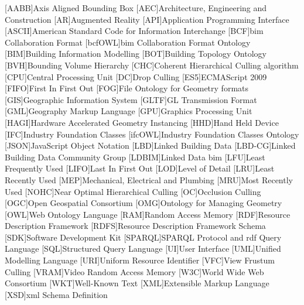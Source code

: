 \documentclass[12pt,a4paper,faculty=ea,language=en,doctype=report]{settings/ugent-doc}
\begin{document}
\begin{acronym}[JSONP]\itemsep2pt\hypersetup{hidelinks}
  [AABB]{Axis Aligned Bounding Box}
  [AEC]{Architecture, Engineering and Construction}
  [AR]{Augmented Reality}
  [API]{Application Programming Interface}
  [ASCII]{American Standard Code for Information Interchange}
  [BCF]{\acs{bim} Collaboration Format}
  [bcfOWL]{\acs{bim} Collaboration Format Ontology}
  [BIM]{Building Information Modelling}
  [BOT]{Building Topology Ontology}
  [BVH]{Bounding Volume Hierarchy}
  [CHC]{Coherent Hierarchical Culling algorithm}
  [CPU]{Central Processing Unit}
  [DC]{Drop Culling}
  [ES5]{ECMAScript 2009}
  [FIFO]{First In First Out}
  [FOG]{File Ontology for Geometry formats}
  [GIS]{Geographic Information System}
  [GLTF]{GL Transmission Format}
  [GML]{Geography Markup Language}
  [GPU]{Graphics Processing Unit}
  [HAGI]{Hardware Accelerated Geometry Instancing}
  [HHD]{Hand Held Device}
  [IFC]{Industry Foundation Classes}
  [ifcOWL]{Industry Foundation Classes Ontology}
  [JSON]{JavaScript Object Notation}
  [LBD]{Linked Building Data}
  [LBD-CG]{Linked Building Data Community Group}
  [LDBIM]{Linked Data \acs{bim}}
  [LFU]{Least Frequently Used}
  [LIFO]{Last In First Out}
  [LOD]{Level of Detail}
  [LRU]{Least Recently Used}
  [MEP]{Mechanical, Electrical and Plumbing}
  [MRU]{Most Recently Used}
  [NOHC]{Near Optimal Hierarchical Culling}
  [OC]{Occlusion Culling}
  [OGC]{Open Geospatial Consortium}
  [OMG]{Ontology for Managing Geometry}
  [OWL]{Web Ontology Language}
  [RAM]{Random Access Memory}
  [RDF]{Resource Description Framework}
  [RDFS]{Resource Description Framework Schema}
  [SDK]{Software Development Kit}
  [SPARQL]{SPARQL Protocol and \acs{rdf} Query Language}
  [SQL]{Structured Query Language}
  [UI]{User Interface}
  [UML]{Unified Modelling Language}
  [URI]{Uniform Resource Identifier}
  [VFC]{View Frustum Culling}
  [VRAM]{Video Random Access Memory}
  [W3C]{World Wide Web Consortium}
  [WKT]{Well-Known Text}
  [XML]{Extensible Markup Language}
  [XSD]{\ac{xml} Schema Definition}
\end{acronym}
\end{document}

